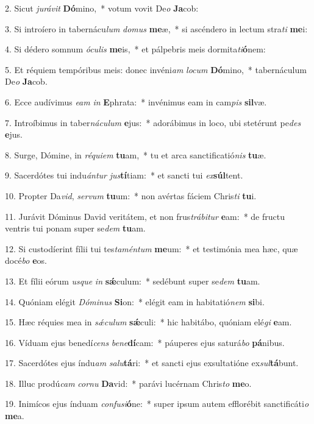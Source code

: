 2. Sicut \textit{ju}\textit{rá}\textit{vit} \textbf{Dó}mino,~*  votum vovit De\textit{o} \textbf{Ja}cob:\

3. Si introíero in tabernácu\textit{lum} \textit{do}\textit{mus} \textbf{me}æ,~*  si ascéndero in lectum stra\textit{ti} \textbf{me}i:\

4. Si dédero somnum \textit{ó}\textit{cu}\textit{lis} \textbf{me}is,~*  et pálpebris meis dormita\textit{ti}\textbf{ó}nem:\

5. Et réquiem tempóribus meis: donec invéni\textit{am} \textit{lo}\textit{cum} \textbf{Dó}mino,~*  tabernáculum De\textit{o} \textbf{Ja}cob.\

6. Ecce audívimus \textit{e}\textit{am} \textit{in} \textbf{E}phrata:~*  invénimus eam in cam\textit{pis} \textbf{sil}væ.\

7. Introíbimus in taber\textit{ná}\textit{cu}\textit{lum} \textbf{e}jus:~*  adorábimus in loco, ubi stetérunt pe\textit{des} \textbf{e}jus.\

8. Surge, Dómine, in \textit{ré}\textit{qui}\textit{em} \textbf{tu}am,~*  tu et arca sanctificatió\textit{nis} \textbf{tu}æ.\

9. Sacerdótes tui indu\textit{án}\textit{tur} \textit{jus}\textbf{tí}tiam:~*  et sancti tui \textit{ex}\textbf{súl}tent.\

10. Propter Da\textit{vid}, \textit{ser}\textit{vum} \textbf{tu}um:~*  non avértas fáciem Chris\textit{ti} \textbf{tu}i.\

11. Jurávit Dóminus David veritátem, et non frus\textit{trá}\textit{bi}\textit{tur} \textbf{e}am:~*  de fructu ventris tui ponam super se\textit{dem} \textbf{tu}am.\

12. Si custodíerint fílii tui tes\textit{ta}\textit{mén}\textit{tum} \textbf{me}um:~*  et testimónia mea hæc, quæ docé\textit{bo} \textbf{e}os.\

13. Et fílii eórum \textit{us}\textit{que} \textit{in} \textbf{sǽ}culum:~*  sedébunt super se\textit{dem} \textbf{tu}am.\

14. Quóniam elégit \textit{Dó}\textit{mi}\textit{nus} \textbf{Si}on:~*  elégit eam in habitatió\textit{nem} \textbf{si}bi.\

15. Hæc réquies mea in \textit{sǽ}\textit{cu}\textit{lum} \textbf{sǽ}culi:~*  hic habitábo, quóniam elé\textit{gi} \textbf{e}am.\

16. Víduam ejus benedí\textit{cens} \textit{be}\textit{ne}\textbf{dí}cam:~*  páuperes ejus saturá\textit{bo} \textbf{pá}nibus.\

17. Sacerdótes ejus índu\textit{am} \textit{sa}\textit{lu}\textbf{tá}ri:~*  et sancti ejus exsultatióne ex\textit{sul}\textbf{tá}bunt.\

18. Illuc prodú\textit{cam} \textit{cor}\textit{nu} \textbf{Da}vid:~*  parávi lucérnam Chris\textit{to} \textbf{me}o.\

19. Inimícos ejus índuam \textit{con}\textit{fu}\textit{si}\textbf{ó}ne:~*  super ipsum autem efflorébit sanctificáti\textit{o} \textbf{me}a.\

